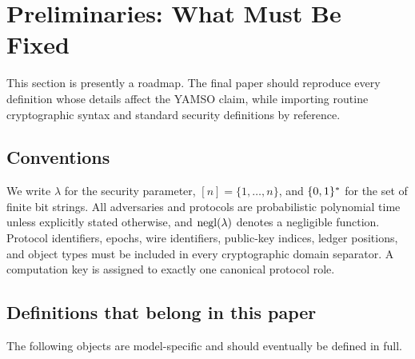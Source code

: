 \section{Preliminaries: What Must Be Fixed}
\label{sec:preliminaries}

This section is presently a roadmap.  The final paper should reproduce every
definition whose details affect the YAMSO claim, while importing routine
cryptographic syntax and standard security definitions by reference.

\subsection{Conventions}

We write $\lambda$ for the security parameter, $[n]=\{1,\ldots,n\}$, and
$\{0,1\}^*$ for the set of finite bit strings.  All adversaries and protocols
are probabilistic polynomial time unless explicitly stated otherwise, and
$\mathop{\mathrm{negl}}(\lambda)$ denotes a negligible function.  Protocol identifiers,
epochs, wire identifiers, public-key indices, ledger positions, and object
types must be included in every cryptographic domain separator.  A computation
key is assigned to exactly one canonical protocol role.

\subsection{Definitions that belong in this paper}

The following objects are model-specific and should eventually be defined in
full.

